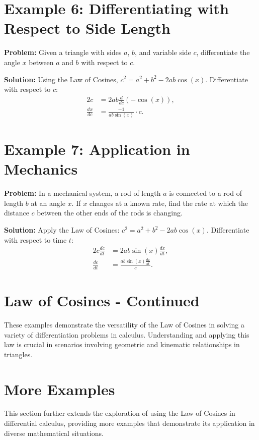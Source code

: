 \documentclass[a4paper,12pt]{book}
\newcounter{problem}
\newcounter{example}
\begin{document}
\section*{Example 6: Differentiating with Respect to Side Length}
\textbf{Problem:} Given a triangle with sides $a$, $b$, and variable side $c$, differentiate the angle $x$ between $a$ and $b$ with respect to $c$.

\textbf{Solution:}
Using the Law of Cosines, $c^2 = a^2 + b^2 - 2ab \cos(x)$. Differentiate with respect to $c$:
\begin{align*}
2c &= 2ab \frac{d}{dc}(-\cos(x)), \\
\frac{dx}{dc} &= \frac{-1}{ab \sin(x)} \cdot c.
\end{align*}

\section*{Example 7: Application in Mechanics}
\textbf{Problem:} In a mechanical system, a rod of length $a$ is connected to a rod of length $b$ at an angle $x$. If $x$ changes at a known rate, find the rate at which the distance $c$ between the other ends of the rods is changing.

\textbf{Solution:}
Apply the Law of Cosines: $c^2 = a^2 + b^2 - 2ab \cos(x)$. Differentiate with respect to time $t$:
\begin{align*}
2c \frac{dc}{dt} &= 2ab \sin(x) \frac{dx}{dt}, \\
\frac{dc}{dt} &= \frac{ab \sin(x) \frac{dx}{dt}}{c}.
\end{align*}

\section*{Law of Cosines - Continued}
These examples demonstrate the versatility of the Law of Cosines in solving a variety of differentiation problems in calculus. Understanding and applying this law is crucial in scenarios involving geometric and kinematic relationships in triangles.

\section*{More Examples}
This section further extends the exploration of using the Law of Cosines in differential calculus, providing more examples that demonstrate its application in diverse mathematical situations.
\end{document}
